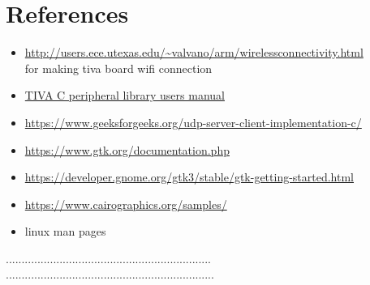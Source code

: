 \documentclass{article}
\begin{document}
	\section{References}
	\begin{itemize}
		\item \url{http://users.ece.utexas.edu/~valvano/arm/wirelessconnectivity.html}\\
		for making tiva board wifi connection
		\item \href{http://www.ti.com/lit/ug/spmu298d/spmu298d.pdf}{TIVA C peripheral library users manual}
		\item \url{https://www.geeksforgeeks.org/udp-server-client-implementation-c/}
		\item \url{https://www.gtk.org/documentation.php}
		\item \url{https://developer.gnome.org/gtk3/stable/gtk-getting-started.html}
		\item \url{https://www.cairographics.org/samples/}
		\item linux man pages
		
		
	\end{itemize}

	
	
	
	
	
	
	
	
	
    .................................................................
    ..................................................................
  


	
	
\end{document}
